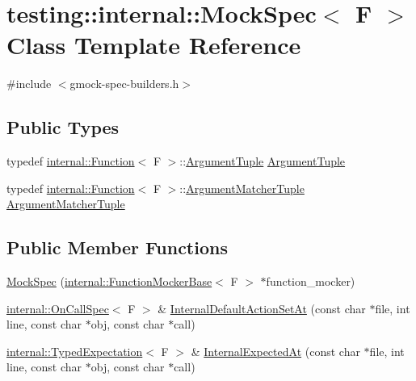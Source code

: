 \hypertarget{classtesting_1_1internal_1_1_mock_spec}{}\section{testing\+:\+:internal\+:\+:Mock\+Spec$<$ F $>$ Class Template Reference}
\label{classtesting_1_1internal_1_1_mock_spec}


{\ttfamily \#include $<$gmock-\/spec-\/builders.\+h$>$}

\subsection*{Public Types}
\begin{DoxyCompactItemize}
\item 
typedef \hyperlink{structtesting_1_1internal_1_1_function}{internal\+::\+Function}$<$ F $>$\+::\hyperlink{classtesting_1_1internal_1_1_mock_spec_a7d520daca5d4d937578b4c7e8f0cf43e}{Argument\+Tuple} \hyperlink{classtesting_1_1internal_1_1_mock_spec_a7d520daca5d4d937578b4c7e8f0cf43e}{Argument\+Tuple}
\item 
typedef \hyperlink{structtesting_1_1internal_1_1_function}{internal\+::\+Function}$<$ F $>$\+::\hyperlink{classtesting_1_1internal_1_1_mock_spec_a35dc5836483cb8c6882c365c447b26cd}{Argument\+Matcher\+Tuple} \hyperlink{classtesting_1_1internal_1_1_mock_spec_a35dc5836483cb8c6882c365c447b26cd}{Argument\+Matcher\+Tuple}
\end{DoxyCompactItemize}
\subsection*{Public Member Functions}
\begin{DoxyCompactItemize}
\item 
\hyperlink{classtesting_1_1internal_1_1_mock_spec_a067fe3d12433cec0aa63f396f4f55fa9}{Mock\+Spec} (\hyperlink{classtesting_1_1internal_1_1_function_mocker_base}{internal\+::\+Function\+Mocker\+Base}$<$ F $>$ $\ast$function\+\_\+mocker)
\item 
\hyperlink{classtesting_1_1internal_1_1_on_call_spec}{internal\+::\+On\+Call\+Spec}$<$ F $>$ \& \hyperlink{classtesting_1_1internal_1_1_mock_spec_a875c99443da1265604d87429693457f4}{Internal\+Default\+Action\+Set\+At} (const char $\ast$file, int line, const char $\ast$obj, const char $\ast$call)
\item 
\hyperlink{classtesting_1_1internal_1_1_typed_expectation}{internal\+::\+Typed\+Expectation}$<$ F $>$ \& \hyperlink{classtesting_1_1internal_1_1_mock_spec_a503a434637634014b9bb6c5d68fd336c}{Internal\+Expected\+At} (const char $\ast$file, int line, const char $\ast$obj, const char $\ast$call)
\end{DoxyCompactItemize}
